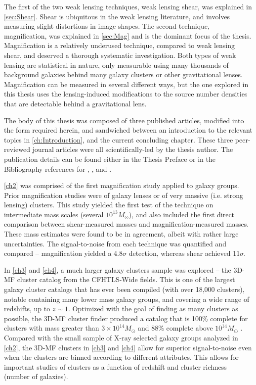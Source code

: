 The first of the two weak lensing techniques, weak lensing shear, was explained in \autoref{sec:Shear}. Shear is ubiquitous in the weak lensing literature, and involves measuring slight distortions in image shapes. The second technique, magnification, was explained in \autoref{sec:Mag} and is the dominant focus of the thesis. Magnification is a relatively underused technique, compared to weak lensing shear, and deserved a thorough systematic investigation. Both types of weak lensing are statistical in nature, only measurable using many thousands of background galaxies behind many galaxy clusters or other gravitational lenses.  Magnification can be measured in several different ways, but the one explored in this thesis uses the lensing-induced modifications to the source number densities that are detectable behind a gravitational lens.

The body of this thesis was composed of three published articles, modified into the form required herein, and sandwiched between an introduction to the relevant topics in \autoref{ch:Introduction}, and the current concluding chapter. These three peer-reviewed journal articles were all scientifically-led by the thesis author. The publication details can be found either in the Thesis Preface or in the Bibliography references for \citet{Ford12}, \citet{Ford14}, and \citet{Ford15}. 

\autoref{ch2} was comprised of the first magnification study applied to galaxy groups. Prior magnification studies were of galaxy lenses or of very massive (i.e. strong lensing) clusters. This study yielded the first test of the technique on intermediate mass scales (several $10^{13} M_{\odot}$), and also included the first direct comparison between shear-measured masses and magnification-measured masses. These mass estimates were found to be in agreement, albeit with rather large uncertainties. The signal-to-noise from each technique was quantified and compared -- magnification yielded a 4.8$\sigma$ detection, whereas shear achieved 11$\sigma$.

In \autoref{ch3} and \autoref{ch4}, a much larger galaxy clusters sample was explored -- the \ac{3D-MF} cluster catalog from the \ac{CFHTLS}-Wide fields. This is one of the largest galaxy cluster catalogs that has ever been compiled (with over 18,000 clusters), notable containing many lower mass galaxy groups, and covering a wide range of redshifts, up to $z \sim 1$. Optimized with the goal of finding as many clusters as possible, the \ac{3D-MF} cluster finder produced a catalog that is 100\% complete for clusters with mass greater than $3 \times 10^{14} M_{\odot}$ and 88\% complete above $10^{14} M_{\odot}$ \citep[see \autoref{sec:3DMF4} or the original \ac{3D-MF} paper][for more details]{Milkeraitis10}. Compared with the small sample of X-ray selected galaxy groups analyzed in \autoref{ch2}, the \ac{3D-MF} clusters in \autoref{ch3} and \autoref{ch4} allow for superior signal-to-noise even when the clusters are binned according to different attributes. This allows for important studies of clusters as a function of redshift and cluster richness (number of galaxies).

